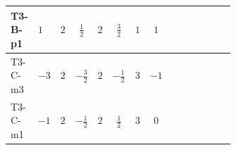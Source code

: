 \documentclass[8pt]{article}
\begin{document}
\begin{landscape}
\begin{longtable}{@{}llcccccc >{\raggedright\arraybackslash}p{0.21\linewidth} >{\raggedright\arraybackslash}p{0.21\linewidth} >{\raggedright\arraybackslash}p{0.21\linewidth}@{}}
T3-B-p1 & $1$ & $2$ & $\frac{1}{2}$ & $2$ & $\frac{3}{2}$ & $1$ & $1$ & \scriptsize\adjustbox{max width=\linewidth}{$\begin{gathered} -\frac{3}{2} (\left({Y_d}\,\left({Y_d}\right)^{\dagger}\,{Y_u}\right)_{ij}-\left({Y_u}\,\left({Y_u}\right)^{\dagger}\,{Y_u}\right)_{ij})\end{gathered}$} & \scriptsize\adjustbox{max width=\linewidth}{$\begin{gathered} -\frac{9}{4} {g_2}^2 \left({Y_u}\right)_{ij}\end{gathered}$} & \scriptsize\adjustbox{max width=\linewidth}{$\begin{gathered} -8 {g_3}^2 \left({Y_u}\right)_{ij}\end{gathered}$} \\
\midrule
T3-C-m3 & $-3$ & $2$ & $-\frac{3}{2}$ & $2$ & $-\frac{1}{2}$ & $3$ & $-1$ & \scriptsize\adjustbox{max width=\linewidth}{$\begin{gathered} -\frac{3}{2} (\left({Y_d}\,\left({Y_d}\right)^{\dagger}\,{Y_u}\right)_{ij}-\left({Y_u}\,\left({Y_u}\right)^{\dagger}\,{Y_u}\right)_{ij})\end{gathered}$} & \scriptsize\adjustbox{max width=\linewidth}{$\begin{gathered} -\frac{9}{4} {g_2}^2 \left({Y_u}\right)_{ij}\end{gathered}$} & \scriptsize\adjustbox{max width=\linewidth}{$\begin{gathered} -8 {g_3}^2 \left({Y_u}\right)_{ij}\end{gathered}$} \\
\midrule
T3-C-m1 & $-1$ & $2$ & $-\frac{1}{2}$ & $2$ & $\frac{1}{2}$ & $3$ & $0$ & \scriptsize\adjustbox{max width=\linewidth}{$\begin{gathered} -\frac{3}{2} (\left({Y_d}\,\left({Y_d}\right)^{\dagger}\,{Y_u}\right)_{ij}-\left({Y_u}\,\left({Y_u}\right)^{\dagger}\,{Y_u}\right)_{ij})\end{gathered}$} & \scriptsize\adjustbox{max width=\linewidth}{$\begin{gathered} -\frac{9}{4} {g_2}^2 \left({Y_u}\right)_{ij}\end{gathered}$} & \scriptsize\adjustbox{max width=\linewidth}{$\begin{gathered} -8 {g_3}^2 \left({Y_u}\right)_{ij}\end{gathered}$} \\
\midrule

\end{longtable}
\end{landscape}
\end{document}
